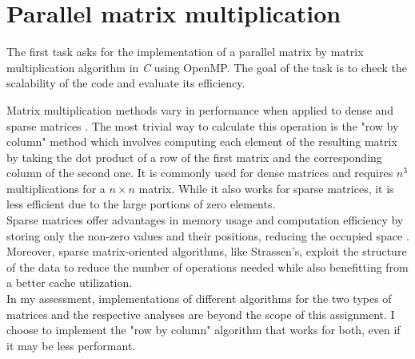 \section{Parallel matrix multiplication}\label{sec:multiplication}

The first task asks for the implementation of a parallel matrix by matrix multiplication %
algorithm in \textit{C} using OpenMP. The goal of the task is to check the scalability %
of the code and evaluate its efficiency.

Matrix multiplication methods vary in performance when applied to dense and sparse %
matrices \cite{algorithms}. The most trivial way to calculate this operation is %
the "row by column" method which involves computing each element of the resulting %
matrix by taking the dot product of a row of the first matrix and the corresponding %
column of the second one. It is commonly used for dense matrices and requires $n^3$ %
multiplications for a $n\times n$ matrix. While it also works for sparse matrices, %
it is less efficient due to the large portions of zero elements.\\%
Sparse matrices offer advantages in memory usage and computation efficiency by %
storing only the non-zero values and their positions, reducing the occupied space %
\cite{ds-algorithms}. Moreover, sparse matrix-oriented algorithms, like Strassen's, %
exploit the structure of the data to reduce the number of operations needed while %
also benefitting from a better cache utilization.\\%
In my assessment, implementations of different algorithms for the two types of %
matrices and the respective analyses are beyond the scope of this assignment. I %
choose to implement the "row by column" algorithm that works for both, even if %
it may be less performant.



